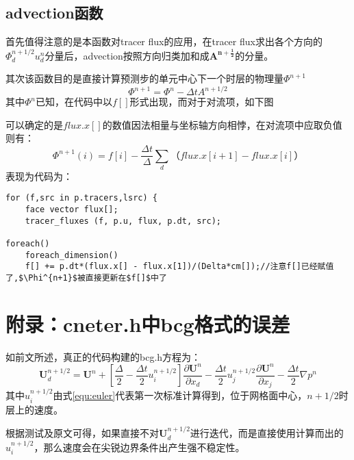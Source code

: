 \documentclass[lang=cn,11pt,a4paper]{elegantpaper}
\begin{document}
\subsection{advection函数}\label{sec:advectionxijie}
首先值得注意的是本函数对tracer flux的应用，在tracer flux求出各个方向的$\Phi^{n+1/2}_d u^{n}_d$分量后，advection按照方向归类加和成$\mathbf{A^{n+\frac{1}{2}}}$的分量。\par
其次该函数目的是直接计算预测步的单元中心下一个时层的物理量$\Phi^{n+1}$
\begin{equation}
    \Phi^{n+1}=\Phi^n-\Delta t A^{n+1/2}
\end{equation}
其中$\Phi^n$已知，在代码中以$f[]$形式出现，而对于对流项，如下图
\begin{center}
\end{center}
可以确定的是$flux.x[]$的数值因法相量与坐标轴方向相悖，在对流项中应取负值则有：
\begin{equation}
    \Phi^{n+1}(i)=f[i]-\frac{\Delta t}{\Delta}\sum_d （flux.x[i+1] - flux.x[i]）
\end{equation}
表现为代码为：
\begin{verbatim}
for (f,src in p.tracers,lsrc) {
    face vector flux[];
    tracer_fluxes (f, p.u, flux, p.dt, src);
    
foreach()
    foreach_dimension()
    f[] += p.dt*(flux.x[] - flux.x[1])/(Delta*cm[]);//注意f[]已经赋值了,$\Phi^{n+1}$被直接更新在$f[]$中了
\end{verbatim}

\section{附录：cneter.h中bcg格式的误差}
如前文所述，真正的代码构建的bcg.h方程为：
\begin{equation}
\mathbf{U}^{n+1/2}_d = \mathbf{U}^n+[\frac{\Delta}{2}-\frac{\Delta t}{2}u_i^{n+1/2}]\frac{\partial \mathbf{U}^n}{\partial x_d} - \frac{\Delta t}{2}u_j^{n+1/2}\frac{\partial \mathbf{U}^n}{\partial x_j}-\frac{\Delta t}{2}\nabla p^n
\end{equation}
其中$u_i^{n+1/2}$由式\ref{equ:euler}代表第一次标准计算得到，位于网格面中心，$n+1/2$时层上的速度。\par
根据测试及原文\cite{popinet2003gerris}可得，如果直接不对$ \mathbf{U}^{n+1/2}_d$进行迭代，而是直接使用计算而出的$u_i^{n+1/2}$，那么速度会在尖锐边界条件出产生强不稳定性。
\printbibliography[heading=bibintoc, title=\ebibname]
\end{document}
